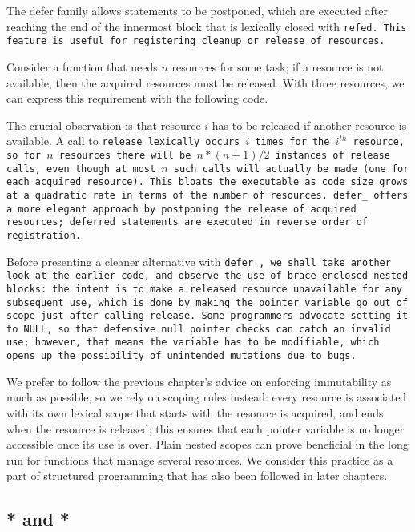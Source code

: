 The defer family allows statements to be postponed, which are executed after
reaching the end of the innermost block that is lexically closed with \tt{refed}.
This feature is useful for registering cleanup or release of resources.

\example Consider a function that needs $n$ resources for some task;
if a resource is not available, then the acquired resources must be released.
With three resources, we can express this requirement with the following code.

\enlargethispage*{\baselineskip}


The crucial observation is that resource $i$ has
to be released if another resource is available.
A call to \tt{release} lexically occurs  $i$ times for the $i^{th}$ resource,
so for $n$ resources there will be $n * (n + 1) / 2$
instances of \tt{release} calls, even though at most $n$ such
calls will actually be made (one for each acquired resource).
This bloats the executable as code size grows at a
quadratic rate in terms of the number of resources.
\tt{defer_} offers a more elegant approach by postponing the release of acquired
resources; deferred statements are executed in reverse order of registration.

\note Before presenting a cleaner alternative with \tt{defer_},
we shall take another look at the earlier code,
and observe the use of brace-enclosed nested blocks: the intent is to make
a released resource unavailable for any subsequent use, which is done by
making the pointer variable go out of scope just after calling \tt{release}.
Some programmers advocate setting it to \tt{NULL},
so that defensive null pointer checks can catch an invalid use;
however, that means the variable has to be modifiable,
which opens up the possibility of unintended mutations due to bugs.

We prefer to follow the previous chapter's advice on enforcing
immutability as much as possible, so we rely on scoping rules instead:
every resource is associated with its own lexical scope that starts with
the resource is acquired, and ends when the resource is released; this
ensures that each pointer variable is no longer accessible once its use is over.
Plain nested scopes can prove beneficial in the
long run for functions that manage several resources.
We consider this practice as a part of structured
programming that has also been followed in later chapters.

\subsection{* and *}


